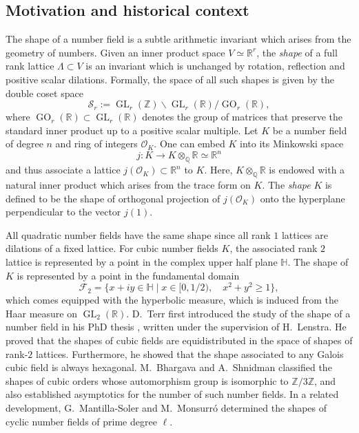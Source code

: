 \documentclass[table]{amsart}
\newcommand{\cF}{\mathcal{F}}
\newcommand{\Q}{\mathbb{Q}}
\newcommand{\cO}{\mathcal{O}}
\newcommand{\op}[1]{\operatorname{#1}}
\numberwithin{equation}{section}
\begin{document}
\subsection{Motivation and historical context}
 The shape of a number field is a subtle arithmetic invariant which arises from the geometry of numbers. Given an inner product space $V\simeq \mathbb{R}^r$, the \emph{shape} of a full rank lattice $\Lambda\subset V$ is an invariant which is unchanged by rotation, reflection and positive scalar dilations. Formally, the space of all such shapes is given by the double coset space
$$
\mathcal{S}_r := \operatorname{GL}_r(\mathbb{Z}) \backslash \operatorname{GL}_r(\mathbb{R}) / \operatorname{GO}_r(\mathbb{R}),
$$
\noindent where $\operatorname{GO}_r(\mathbb{R}) \subset \operatorname{GL}_r(\mathbb{R})$ denotes the group of matrices that preserve the standard inner product up to a positive scalar multiple.
Let $K$ be a number field of degree $n$ and ring of integers $\cO_K$. One can embed $K$ into its Minkowski space 
 \[j: K\rightarrow K\otimes_{\Q} \mathbb{R}\simeq \mathbb{R}^n\] and thus associate a lattice $j(\cO_K)\subset \mathbb{R}^n$ to $K$. Here, $K\otimes_{\Q} \mathbb{R}$ is endowed with a natural inner product which arises from the trace form on $K$. The \emph{shape} $K$ is defined to be the shape of orthogonal projection of $j(\cO_K)$ onto the hyperplane perpendicular to the vector $j(1)$. 
\par All quadratic number fields have the same shape since all rank $1$ lattices are dilations of a fixed lattice. For cubic number fields $K$, the associated rank $2$ lattice is represented by a point in the complex upper half plane $\mathbb{H}$. The shape of $K$ is represented by a point in the fundamental domain \[\cF_2=\{x+iy\in \mathbb{H}\mid x\in [0, 1/2), \quad x^2+y^2\geq 1\},\] which comes equipped with the hyperbolic measure, which is induced from the Haar measure on $\op{GL}_2(\mathbb{R})$. 
D.~Terr first introduced the study of the shape of a number field in his PhD thesis \cite{Terr97}, written under the supervision of H.~Lenstra. He proved that the shapes of cubic fields are equidistributed in the space of shapes of rank-$2$ lattices. Furthermore, he showed that the shape associated to any Galois cubic field is always hexagonal. M.~Bhargava and A.~Shnidman \cite{BS14} classified the shapes of cubic orders whose automorphism group is isomorphic to $\mathbb{Z}/3\mathbb{Z}$, and also established asymptotics for the number of such number fields. In a related development, G.~Mantilla-Soler and M.~Monsurró \cite{MSM16} determined the shapes of cyclic number fields of prime degree $\ell$. 
\end{document}
